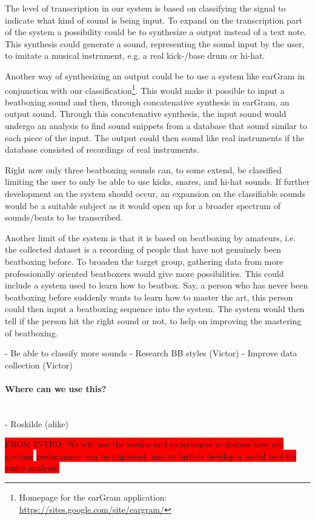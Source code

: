 The level of transcription in our system is based on classifying the signal to indicate what kind of sound is being input. To expand on the transcription part of the system a possibility could be to synthesize a output instead of a text note. This synthesis could generate a sound, representing the sound input by the user, to imitate a musical instrument, e.g. a real kick-/base drum or hi-hat.

Another way of synthesizing an output could be to use a system like earGram in conjunction with our classification\footnote{Homepage for the earGram application: \url{https://sites.google.com/site/eargram/}}. This would make it possible to input a beatboxing sound and then, through concatenative synthesis in earGram, an output sound. Through this concatenative synthesis, the input sound would undergo an analysis to find sound snippets from a database that sound similar to each piece of the input. The output could then sound like real instruments if the database consisted of recordings of real instruments.

Right now only three beatboxing sounds can, to some extend, be classified limiting the user to only be able to use kicks, snares, and hi-hat sounds. If further development on the system should occur, an expansion on the classifiable sounds would be a suitable subject as it would open up for a broader spectrum of sounds/beats to be transcribed.

Another limit of the system is that it is based on beatboxing by amateurs, i.e. the collected dataset is a recording of people that have not genuinely been beatboxing before. To broaden the target group, gathering data from more professionally oriented beatboxers would give more possibilities. This could include a system used to learn how to beatbox. Say, a person who has never been beatboxing before suddenly wants to learn how to master the art, this person could then input a beatboxing sequence into the system. The system would then tell if the person hit the right sound or not, to help on improving the mastering of beatboxing.

	- Be able to classify more sounds
		- Research BB styles (Victor)
	- Improve data collection (Victor)


\paragraph{Where can we use this?} \hspace{0pt} \\


	- Roskilde (alike)

\colorbox{red}{FROM INTRO: We will use the results and experiences to discuss how
our systems}
\colorbox{red}{performance can be improved, and to further develop a useful tool for audio
analysis.}
